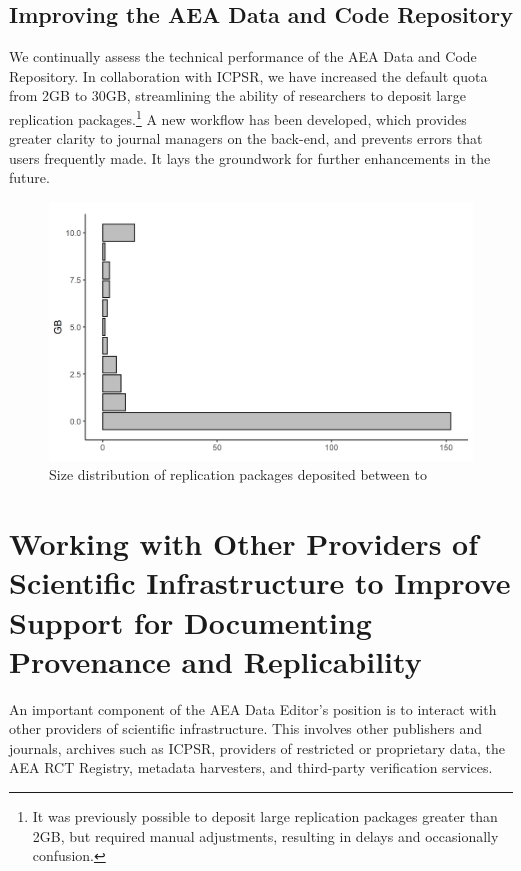 \documentclass[PP]{AEA}
\newcommand{\aeadcr}{AEA Data and Code Repository}
\begin{document}
\subsection{Improving the \aeadcr{}}
\label{sec:improvingaeadcr}

We continually assess the technical performance of the \aeadcr{}. In collaboration with ICPSR, we have increased the default quota from 2GB to 30GB, streamlining the ability of researchers to deposit large replication packages.\footnote{It was previously possible to deposit large replication packages greater than 2GB, but required manual adjustments, resulting in delays and occasionally confusion.} A new workflow has been developed, which provides greater clarity to journal managers on the back-end, and prevents errors that users frequently made. It lays the groundwork for further enhancements in the future. 


\begin{figure}[t]
    \centering
    \includegraphics[width=\textwidth]{images/plot_filesize_dist.png} 
    \caption{Size distribution of replication packages deposited between  \firstday{} to \lastday{}}
    \label{fig:size_packages}
\end{figure}



\section{Working with Other Providers of Scientific Infrastructure to Improve Support for Documenting Provenance and Replicability}
\label{sec:coordination}

An important component of the AEA Data Editor's position is to interact with other providers of scientific infrastructure. This involves other publishers and journals, archives such as ICPSR, providers of restricted or proprietary data, the AEA RCT Registry, metadata harvesters, and third-party verification services. 
\end{document}

